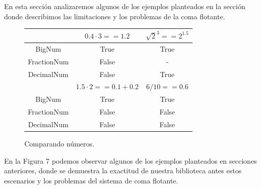 \documentclass[a4paper,10pt,twocolumn]{article}
\begin{document}
En esta sección analizaremos algunos de los ejemplos planteados en la sección donde describimos las limitaciones y los problemas de la coma flotante.

\begin{figure}[h!]%
	\begin{center}
		\begin{tabular}{|c|c|c|} \hline
			            & $0.4\cdot 3==1.2$     & $\sqrt{2}^3==2^{1.5}$ \\ \hline
			BigNum      & True                  & True                  \\ \hline
			FractionNum & False                 & -                     \\ \hline
			DecimalNum  & False                 & True                  \\ \hline
			            & $1.5\cdot 2==0.1+0.2$ & $6/10==0.6$           \\ \hline
			BigNum      & True                  & True                  \\ \hline
			FractionNum & False                 & False                 \\ \hline
			DecimalNum  & False                 & False                 \\ \hline
			
		\end{tabular}
		\caption{Comparando números. \label{fig:ex}}
	\end{center}
\end{figure}

En la Figura 7 podemos observar algunos de los ejemplos planteados en secciones anteriores, donde se demuestra la exactitud de nuestra biblioteca antes estos escenarios y los problemas del sistema de coma flotante.



\onecolumn

\end{document}
